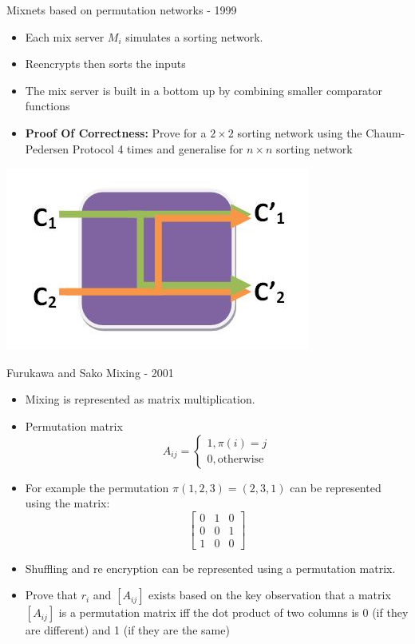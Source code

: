 \documentclass{beamer}
\begin{document}
\begin{frame}[allowframebreaks]{Mixnets based on permutation networks - 1999}
\begin{itemize}
\item Each mix server $M_i$ simulates a sorting network.
\item Reencrypts then sorts the inputs
\item The mix server is built in a bottom up  by combining smaller comparator functions
\item \textbf{Proof Of Correctness:} Prove for a $2 \times 2$  sorting network using the Chaum-Pedersen Protocol 4 times and generalise for $n \times n$ sorting network
\end{itemize}
\begin{center}
\includegraphics[scale=0.3]{Mix2x2.jpg}
\end{center}


\end{frame}

\begin{frame}[allowframebreaks]{Furukawa and Sako Mixing - 2001}
\begin{itemize}
\item Mixing is represented as matrix multiplication.
\item Permutation matrix
\[
A_{ij} = \begin{cases} 1, \pi(i)=j \\ 0, \text{otherwise} \end{cases}
\]
\item For example the permutation $\pi(1,2,3) = (2,3,1)$ can be represented using the matrix:
\[\begin{bmatrix}
  0 & 1 & 0 \\
  0 & 0 & 1 \\
  1 & 0 & 0
 \end{bmatrix}\]
\item Shuffling and re encryption can be represented using a permutation matrix.
\item Prove that $r_i$ and $[A_{ij}]$ exists based on the key observation that a matrix $[A_{ij}]$ is a permutation matrix iff the dot product of two columns is 0 (if they are different) and 1 (if they are the same)
\end{itemize}
\end{frame}
\end{document}
